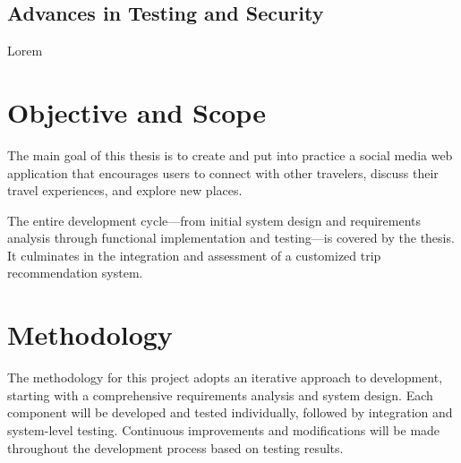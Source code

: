 \subsection{Advances in Testing and Security}
\par Lorem \cite{}



\section{Objective and Scope}
\par The main goal of this thesis is to create and put into practice a social media web application that encourages users to connect with other travelers, discuss their travel experiences, and explore new places.

The entire development cycle—from initial system design and requirements analysis through functional implementation and testing—is covered by the thesis. It culminates in the integration and assessment of a customized trip recommendation system.

\section{Methodology}
\par The methodology for this project adopts an iterative approach to development, starting with a comprehensive requirements analysis and system design. Each component will be developed and tested individually, followed by integration and system-level testing. Continuous improvements and modifications will be made throughout the development process based on testing results.